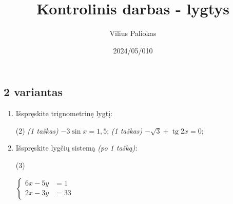 \documentclass[a4paper]{article}
\title{Kontrolinis darbas - lygtys}
\author{Vilius Paliokas}
\date{2024/05/010}
\DeclareMathOperator{\tg}{tg}
\begin{document}
\thispagestyle{fancy}

\titlespacing*{\subsection}{0pt}{.75ex}{0.75ex}

\subsection*{2 variantas}

\begin{enumerate}
      \item Išspręskite trignometrinę lygtį:
            \begin{tasks}[item-format={\normalfont}, after-item-skip=4mm](2)
                  \task \textit{(1 taškas)} $-3\sin{x}=1,5$;
                  \task \textit{(1 taškas)} $-\sqrt{3}+\tg{2x}=0$;
            \end{tasks}

      \item Išspręskite lygčių sistemą \textit{(po 1 tašką)}:
            \begin{tasks}[item-format={\normalfont}, after-item-skip=4mm](3)
                  \task   \par\vspace{-1.3\baselineskip}%
                  $\left\{\begin{aligned}
                              6x - 5y & = 1  \\
                              2x - 3y & = 33
                        \end{aligned}\right.$


\end{tasks}
\end{enumerate}
\end{document}
